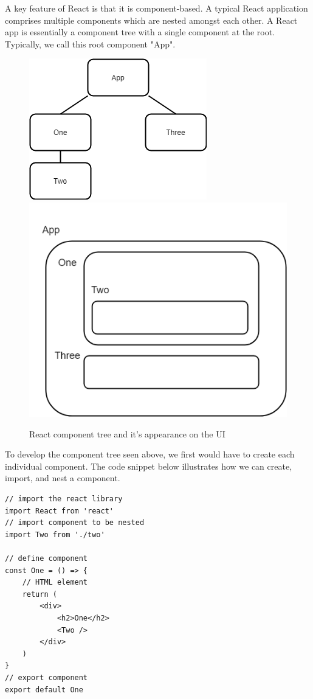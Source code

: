 A key feature of React is that it is component-based. A typical React application comprises multiple components which are nested amongst each other. A React app is essentially a component tree with a single component at the root. Typically, we call this root component "App".    

\begin{figure}[H]
    \centering
    \includegraphics[scale=0.5]{img/TechReview/ReactComponents.png}
    \includegraphics[scale=0.4]{img/TechReview/web-components.png}
    \caption{React component tree and it's appearance on the UI}
\end{figure}

To develop the component tree seen above, we first would have to create each individual component. The code snippet below illustrates how we can create, import, and nest a component.    

\begin{verbatim}
// import the react library
import React from 'react'
// import component to be nested 
import Two from './two'

// define component
const One = () => {
    // HTML element 
    return (
        <div>
            <h2>One</h2>
            <Two />
        </div>
    )
}
// export component
export default One
\end{verbatim}

